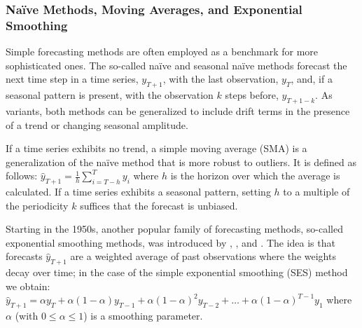 \subsubsection{Na\"{i}ve Methods, Moving Averages, and Exponential Smoothing}
\label{ets}

Simple forecasting methods are often employed as a benchmark for more
    sophisticated ones.
The so-called na\"{i}ve and seasonal na\"{i}ve methods forecast the next time
    step in a time series, $y_{T+1}$, with the last observation, $y_T$,
    and, if a seasonal pattern is present, with the observation $k$ steps
    before, $y_{T+1-k}$.
As variants, both methods can be generalized to include drift terms in the
    presence of a trend or changing seasonal amplitude.

If a time series exhibits no trend, a simple moving average (SMA) is a
    generalization of the na\"{i}ve method that is more robust to outliers.
It is defined as follows: $\hat{y}_{T+1} = \frac{1}{h} \sum_{i=T-h}^{T} y_i$
    where $h$ is the horizon over which the average is calculated.
If a time series exhibits a seasonal pattern, setting $h$ to a multiple of the
    periodicity $k$ suffices that the forecast is unbiased.

Starting in the 1950s, another popular family of forecasting methods,
    so-called exponential smoothing methods, was introduced by
    \cite{brown1959}, \cite{holt1957}, and \cite{winters1960}.
The idea is that forecasts $\hat{y}_{T+1}$ are a weighted average of past
    observations where the weights decay over time; in the case of the simple
    exponential smoothing (SES) method we obtain:
$
\hat{y}_{T+1} = \alpha y_T + \alpha (1 - \alpha) y_{T-1}
                + \alpha (1 - \alpha)^2 y_{T-2}
                + \dots + \alpha (1 - \alpha)^{T-1} y_{1}
$
where $\alpha$ (with $0 \le \alpha \le 1$) is a smoothing parameter.

